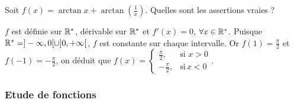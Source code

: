 \begin{question} 

Soit   $f(x)= \arctan x + \arctan (\frac{1}{x})$.  Quelles sont les assertions vraies ?

\begin{answers}
    



    
\end{answers}
\begin{explanations}
$f$ est définie sur $\mathbb{R}^*$,  dérivable sur  $\mathbb{R}^*$ et $f'(x)=0$, $\forall x \in \mathbb{R}^*$. Puisque $\mathbb{R}^* =]-\infty,0[\cup ]0,+\infty[$, $f$ est constante sur chaque intervalle. Or $f(1)=\frac{\pi}{2}$ et $f(-1)=-\frac{\pi}{2}$, on déduit que $f(x)=\left\{\begin{array}{cc}\frac{\pi}{2},& \mbox{si} \, \, x >0 \\ -\frac{\pi}{2},& \mbox{si} \,  x <0  \end{array}\right.$.
\end{explanations}

\end{question}

\subsubsection{Etude de fonctions}


